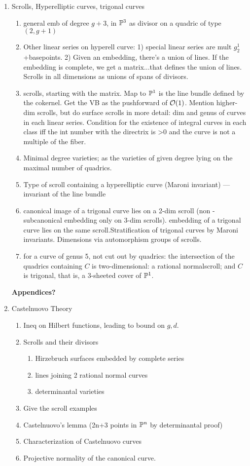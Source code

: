 \documentclass[12pt, leqno]{article}
\begin{document}
\begin{enumerate}
\item Scrolls, Hyperelliptic curves, trigonal curves 
\begin{enumerate}
\item general emb of degree $g+3$, in ${\mathbb P}^3$ as divisor on a quadric of type $(2,g+1)$
\item Other linear series on hyperell curve: 1) special linear series are mult $g^1_2$+basepoints. 2) Given an embedding, there's a union of lines. If the embedding is complete, we get a matrix...that defines the union of lines. Scrolls in all dimensions as unions of spans of divisors. 
\item scrolls, starting with the matrix. Map to ${\mathbb P}^1$ is the line bundle defined by the cokernel. Get the VB as the pushforward of ${\mathcal O}(1)$.
Mention higher-dim scrolls, but do surface scrolls in more detail: dim and genus of curves in each linear series. Condition for the existence of integral curves in each class iff the int number with the directrix is >0 and the curve is not a multiple of the fiber. 
\item Minimal degree varieties; as the varieties of given degree lying on the maximal number of quadrics. 
\item Type of scroll containing a hyperelliptic curve (Maroni invariant) --- invariant of the line bundle
\item canonical image of a trigonal curve lies on a 2-dim scroll (non -subcanonical embedding only on 3-dim scrolls).  embedding of a trigonal curve lies on the same scroll.Stratification of trigonal curves by Maroni invariants. Dimensions via automorphism groups of scrolls.
\item for a curve of genus 5, not cut out by quadrics:
 the intersection of the quadrics containing $C$ is two-dimensional: a rational normalscroll;  and  $C$ is trigonal, that is, a 3-sheeted cover of ${\mathbb P}^1$. 

\end{enumerate}

\bigbreak

\centerline {\bf Appendices?}
\item Castelnuovo Theory
\begin{enumerate}
\item Ineq on Hilbert functions, leading to bound on $g,d$. 
\item Scrolls and their divisors
\begin{enumerate}
 \item Hirzebruch surfaces embedded by complete series
 \item lines joining 2 rational normal curves
 \item determinantal varieties
\end{enumerate}
\item Give the scroll examples
\item Castelnuovo's lemma (2n+3 points in ${\mathbb P}^n$ by determinantal proof) 
\item Characterization of Castelnuovo curves
\item Projective normality of the canonical curve.
\end{enumerate}


\end{enumerate}
\end{document}
